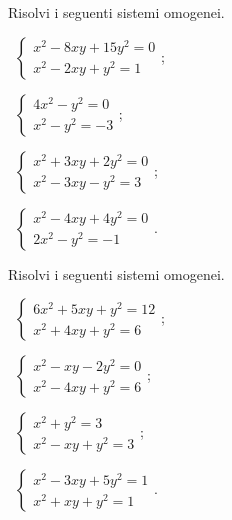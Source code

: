 \begin{esercizio}[\Ast]
\label{ese:6.39}
Risolvi i seguenti sistemi omogenei.
\begin{multicols}{2}
 \begin{enumeratea}
 \item~$\left\{\begin{array}{l}x^2-8xy+15y^2=0\\x^2-2xy+y^2=1\end{array}\right.$;
 \item~$\left\{\begin{array}{l}4x^2-y^2=0\\x^2-y^2=-3\end{array}\right.$;
 \item~$\left\{\begin{array}{l}x^2+3xy+2y^2=0\\x^2-3xy-y^2=3\end{array}\right.$;
 \item~$\left\{\begin{array}{l}x^2-4xy+4y^2=0\\2x^2-y^2=-1\end{array}\right.$.
 \end{enumeratea}
\end{multicols}
\end{esercizio}

\begin{esercizio}[\Ast]
\label{ese:6.40}
Risolvi i seguenti sistemi omogenei.
\begin{multicols}{2}
 \begin{enumeratea}
 \item~$\left\{\begin{array}{l}6x^2+5xy+y^2=12\\x^2+4xy+y^2=6\end{array}\right.$;
 \item~$\left\{\begin{array}{l}x^2-xy-2y^2=0\\x^2-4xy+y^2=6\end{array}\right.$;
 \item~$\left\{\begin{array}{l}x^2+y^2=3\\x^2-xy+y^2=3\end{array}\right.$;
 \item~$\left\{\begin{array}{l}x^2-3xy+5y^2=1\\x^2+xy+y^2=1\end{array}\right.$.
 \end{enumeratea}
\end{multicols}
\end{esercizio}

